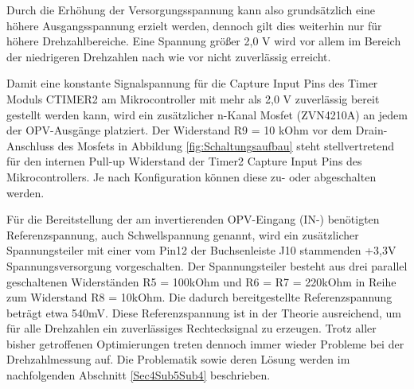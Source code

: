 Durch die Erhöhung der Versorgungsspannung kann also grundsätzlich eine höhere Ausgangsspannung erzielt werden, dennoch gilt dies weiterhin nur für höhere Drehzahlbereiche. Eine Spannung größer 2,0 V wird vor allem im Bereich der niedrigeren Drehzahlen nach wie vor nicht zuverlässig erreicht.\vspace{11pt}

Damit eine konstante Signalspannung für die Capture Input Pins des Timer Moduls CTIMER2 am Mikrocontroller mit mehr als 2,0 V zuverlässig bereit gestellt werden kann, wird ein zusätzlicher n-Kanal Mosfet (ZVN4210A) an jedem der OPV-Ausgänge platziert. Der Widerstand R9 = 10 kOhm vor dem Drain-Anschluss des Mosfets in Abbildung \ref{fig:Schaltungsaufbau} steht stellvertretend für den internen Pull-up Widerstand der Timer2 Capture Input Pins des Mikrocontrollers. Je nach Konfiguration können diese zu- oder abgeschalten werden.\vspace{11pt}

Für die Bereitstellung der am invertierenden OPV-Eingang (IN-) benötigten Referenzspannung, auch Schwellspannung genannt, wird ein zusätzlicher Spannungsteiler mit einer vom Pin12 der Buchsenleiste J10 stammenden +3,3V Spannungsversorgung vorgeschalten. Der Spannungsteiler besteht aus drei parallel geschaltenen Widerständen R5 = 100kOhm und R6 = R7 = 220kOhm in Reihe zum Widerstand R8 = 10kOhm. Die dadurch bereitgestellte Referenzspannung beträgt etwa 540mV. Diese Referenzspannung ist in der Theorie ausreichend, um für alle Drehzahlen ein zuverlässiges Rechtecksignal zu erzeugen. Trotz aller bisher getroffenen Optimierungen treten dennoch immer wieder Probleme bei der Drehzahlmessung auf. Die Problematik sowie deren Lösung werden im nachfolgenden Abschnitt \ref{Sec4Sub5Sub4}  beschrieben.

